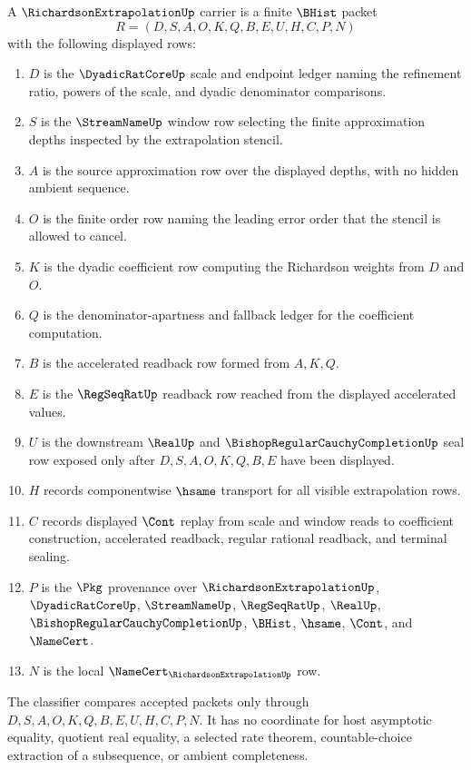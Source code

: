 \begin{definition}
\label{def:richardson-extrapolation-carrier}
A $\RichardsonExtrapolationUp$ carrier is a finite $\BHist$ packet
$$
R=(D,S,A,O,K,Q,B,E,U,H,C,P,N)
$$
with the following displayed rows:
\begin{enumerate}
\item $D$ is the $\DyadicRatCoreUp$ scale and endpoint ledger naming the refinement ratio, powers of the scale, and dyadic denominator comparisons.
\item $S$ is the $\StreamNameUp$ window row selecting the finite approximation depths inspected by the extrapolation stencil.
\item $A$ is the source approximation row over the displayed depths, with no hidden ambient sequence.
\item $O$ is the finite order row naming the leading error order that the stencil is allowed to cancel.
\item $K$ is the dyadic coefficient row computing the Richardson weights from $D$ and $O$.
\item $Q$ is the denominator-apartness and fallback ledger for the coefficient computation.
\item $B$ is the accelerated readback row formed from $A,K,Q$.
\item $E$ is the $\RegSeqRatUp$ readback row reached from the displayed accelerated values.
\item $U$ is the downstream $\RealUp$ and $\BishopRegularCauchyCompletionUp$ seal row exposed only after $D,S,A,O,K,Q,B,E$ have been displayed.
\item $H$ records componentwise $\hsame$ transport for all visible extrapolation rows.
\item $C$ records displayed $\Cont$ replay from scale and window reads to coefficient construction, accelerated readback, regular rational readback, and terminal sealing.
\item $P$ is the $\Pkg$ provenance over $\RichardsonExtrapolationUp$, $\DyadicRatCoreUp$, $\StreamNameUp$, $\RegSeqRatUp$, $\RealUp$, $\BishopRegularCauchyCompletionUp$, $\BHist$, $\hsame$, $\Cont$, and $\NameCert$.
\item $N$ is the local $\NameCert_{\RichardsonExtrapolationUp}$ row.
\end{enumerate}
The classifier compares accepted packets only through $D,S,A,O,K,Q,B,E,U,H,C,P,N$. It has no coordinate for host asymptotic equality, quotient real equality, a selected rate theorem, countable-choice extraction of a subsequence, or ambient completeness.
\end{definition}

